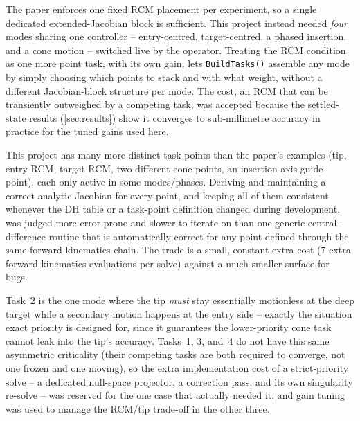 \documentclass[11pt,a4paper]{article}
\newcommand{\code}[1]{\texttt{#1}}
\begin{document}
\begin{description}[leftmargin=0pt,style=nextline]
\item[\textbf{Soft, gain-weighted RCM task instead of a hard velocity constraint.}] The paper enforces one fixed RCM placement per experiment, so a single dedicated extended-Jacobian block is sufficient. This project instead needed \emph{four} modes sharing one controller -- entry-centred, target-centred, a phased insertion, and a cone motion -- switched live by the operator. Treating the RCM condition as one more point task, with its own gain, lets \code{BuildTasks()} assemble any mode by simply choosing which points to stack and with what weight, without a different Jacobian-block structure per mode. The cost, an RCM that can be transiently outweighed by a competing task, was accepted because the settled-state results (\cref{sec:results}) show it converges to sub-millimetre accuracy in practice for the tuned gains used here.
\item[\textbf{Purely numerical (finite-difference) Jacobians instead of analytic ones.}] This project has many more distinct task points than the paper's examples (tip, entry-RCM, target-RCM, two different cone points, an insertion-axis guide point), each only active in some modes/phases. Deriving and maintaining a correct analytic Jacobian for every point, and keeping all of them consistent whenever the DH table or a task-point definition changed during development, was judged more error-prone and slower to iterate on than one generic central-difference routine that is automatically correct for any point defined through the same forward-kinematics chain. The trade is a small, constant extra cost (7 extra forward-kinematics evaluations per solve) against a much smaller surface for bugs.
\item[\textbf{Strict task priority only for Task~2, flat weighting elsewhere.}] Task~2 is the one mode where the tip \emph{must} stay essentially motionless at the deep target while a secondary motion happens at the entry side -- exactly the situation exact priority is designed for, since it guarantees the lower-priority cone task cannot leak into the tip's accuracy. Tasks~1, 3, and~4 do not have this same asymmetric criticality (their competing tasks are both required to converge, not one frozen and one moving), so the extra implementation cost of a strict-priority solve -- a dedicated null-space projector, a correction pass, and its own singularity re-solve -- was reserved for the one case that actually needed it, and gain tuning was used to manage the RCM/tip trade-off in the other three.

\end{description}
\end{document}
